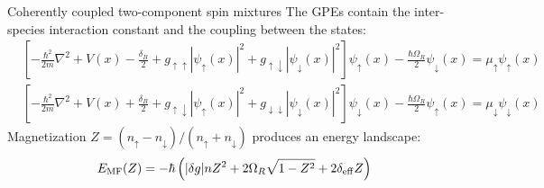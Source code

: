 \documentclass[aspectratio=169]{beamer}
\begin{document}

\begin{frame}{Coherently coupled two-component spin mixtures}
  The GPEs contain the inter-species interaction constant and the coupling between the states:
  \begin{equation*}
    \begin{aligned}
        &\left[ -\frac{\hbar^2}{2m}\nabla^2 + V(x) - \frac{\delta_B}{2} + g_{\uparrow\uparrow}|\psi_\uparrow(x)|^2 + g_{\uparrow\downarrow}|\psi_\downarrow(x)|^2
        \right] \psi_\uparrow(x) - \frac{\hbar\Omega_R}{2}\psi_\downarrow(x) = \mu_\uparrow \psi_\uparrow(x) \\
        &\left[ -\frac{\hbar^2}{2m}\nabla^2 + V(x) + \frac{\delta_B}{2} + g_{\uparrow\downarrow}|\psi_\uparrow(x)|^2 + g_{\downarrow\downarrow}|\psi_\downarrow(x)|^2
        \right] \psi_\downarrow(x) - \frac{\hbar\Omega_R}{2}\psi_\uparrow(x) = \mu_\downarrow \psi_\downarrow(x)
    \end{aligned}
  \end{equation*}
  Magnetization $Z = (n_\uparrow-n_\downarrow)/(n_\uparrow+n_\downarrow)$ produces an energy landscape:
  \begin{equation*}
      E_{\rm MF}(Z) = -\hbar\left(|\delta g|n Z^2 + 2\Omega_R \sqrt{1-Z^2} + 2\delta_{\rm eff} Z\right)
      \label{eq:E_MF}
  \end{equation*}
\end{frame}
\end{document}
